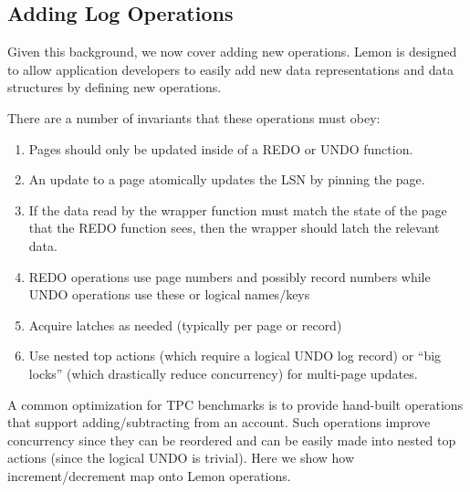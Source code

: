 \documentclass[10pt,letterpaper,twocolumn,english]{article}
\newcommand{\yad}{Lemon\xspace}
\begin{document}
\subsection{Adding Log Operations}
\label{op-def}


Given this background, we now cover adding new operations. \yad is
designed to allow application developers to easily add new data
representations and data structures by defining new operations.

There are a number of invariants that these operations must obey:
\begin{enumerate}
\item Pages should only be updated inside of a REDO or UNDO function.
\item An update to a page atomically updates the LSN by pinning the page.
\item If the data read by the wrapper function must match the state of
the page that the REDO function sees, then the wrapper should latch
the relevant data.
\item REDO operations use page numbers and possibly record numbers
while UNDO operations use these or logical names/keys
\item Acquire latches as needed (typically per page or record)
\item Use nested top actions (which require a logical UNDO log record) 
or ``big locks'' (which drastically reduce concurrency) for multi-page updates.
\end{enumerate}


A common optimization for TPC benchmarks is to provide hand-built
operations that support adding/subtracting from an account.  Such
operations improve concurrency since they can be reordered and can be
easily made into nested top actions (since the logical UNDO is
trivial). Here we show how increment/decrement map onto \yad operations.
\end{document}

